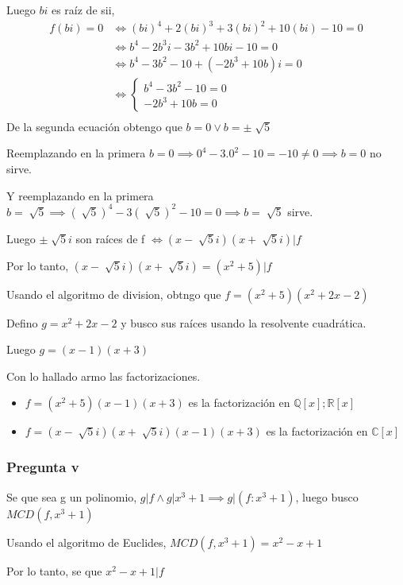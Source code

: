 Luego $ bi $ es raíz de sii,
\begin{align*}
    f(bi) = 0 &\iff (bi)^4 + 2(bi)^3 + 3(bi)^2 + 10(bi) - 10 = 0 \\
    &\iff b^4 - 2b^3i - 3b^2 + 10bi - 10 = 0 \\
    &\iff b^4 - 3b^2 - 10 + (- 2b^3  + 10b)i  = 0 \\
    &\iff \begin{cases}
        b^4 - 3b^2 - 10 = 0 \\
        - 2b^3  + 10b = 0
    \end{cases} \\
\end{align*}
De la segunda ecuación obtengo que $ b = 0 \vee b = \pm \sqrt[]{5} $

Reemplazando en la primera $ b = 0 \implies 0^4 - 3.0^2 - 10 = -10 \neq 0 \implies b= 0 $ no sirve.

Y reemplazando en la primera $ b = \sqrt[]{5} \implies (\sqrt[]{5})^4 - 3(\sqrt[]{5})^2 - 10 = 0 \implies b = \sqrt[]{5} $ sirve.

Luego $ \pm \sqrt[]{5}i $ son raíces de f $ \iff (x-\sqrt[]{5}i)(x+\sqrt[]{5}i) | f $

Por lo tanto, $ (x-\sqrt[]{5}i)(x+\sqrt[]{5}i) = (x^2+5) | f $

Usando el algoritmo de division, obtngo que $ f = (x^2+5)(x^2+2x-2) $

Defino $ g = x^2+2x-2 $ y busco sus raíces usando la resolvente cuadrática.

Luego $ g = (x-1)(x+3) $

Con lo hallado armo las factorizaciones.
\begin{itemize}
    \item $ f = (x^2 + 5)(x-1)(x+3) $ es la factorización en $ \mathbb{Q}[x]; \mathbb{R}[x] $
    \item $ f = (x-\sqrt[]{5}i)(x+\sqrt[]{5}i)(x-1)(x+3) $ es la factorización en $ \mathbb{C}[x] $
\end{itemize}

\subsubsection{Pregunta v}

Se que sea g un polinomio, $ g|f \wedge g|x^3+1 \implies g|(f:x^3+1) $, luego busco $ MCD(f, x^3+1) $

Usando el algoritmo de Euclides, $ MCD(f, x^3+1) = x^2-x+1 $

Por lo tanto, se que $ x^2-x+1 | f $

